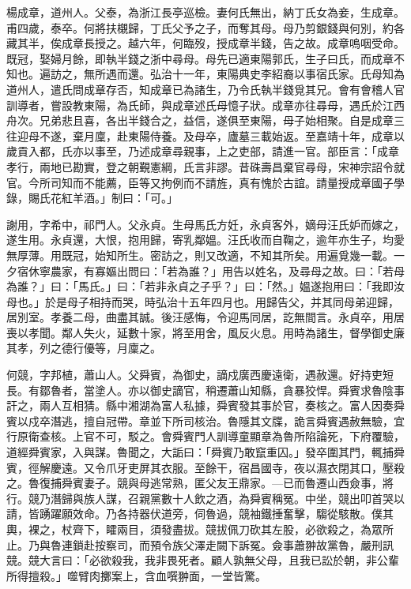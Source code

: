 \begin{pinyinscope}
楊成章，道州人。父泰，為浙江長亭巡檢。妻何氏無出，納丁氏女為妾，生成章。甫四歲，泰卒。何將扶櫬歸，丁氏父予之子，而奪其母。母乃剪銀錢與何別，約各藏其半，俟成章長授之。越六年，何臨歿，授成章半錢，告之故。成章嗚咽受命。既冠，娶婦月餘，即執半錢之浙中尋母。母先已適東陽郭氏，生子曰氏，而成章不知也。遍訪之，無所遇而還。弘治十一年，東陽典史李紹裔以事宿氏家。氏母知為道州人，遣氏問成章存否，知成章已為諸生，乃令氏執半錢覓其兄。會有會稽人官訓導者，嘗設教東陽，為氏師，與成章述氏母憶子狀。成章亦往尋母，遇氏於江西舟次。兄弟悲且喜，各出半錢合之，益信，遂俱至東陽，母子始相聚。自是成章三往迎母不遂，棄月廩，赴東陽侍養。及母卒，廬墓三載始返。至嘉靖十年，成章以歲貢入都，氏亦以事至，乃述成章尋親事，上之吏部，請進一官。部臣言：「成章孝行，兩地已勘實，登之朝覲憲綱，氏言非謬。昔硃壽昌棄官尋母，宋神宗詔令就官。今所司知而不能薦，臣等又拘例而不請旌，真有愧於古誼。請量授成章國子學錄，賜氏花紅羊酒。」制曰：「可。」

謝用，字希中，祁門人。父永貞。生母馬氏方妊，永貞客外，嫡母汪氏妒而嫁之，遂生用。永貞還，大恨，抱用歸，寄乳鄰媼。汪氏收而自鞠之，逾年亦生子，均愛無厚薄。用既冠，始知所生。密訪之，則又改適，不知其所矣。用遍覓幾一載。一夕宿休寧農家，有寡嫗出問曰：「若為誰？」用告以姓名，及尋母之故。曰：「若母為誰？」曰：「馬氏。」曰：「若非永貞之子乎？」曰：「然。」媼遂抱用曰：「我即汝母也。」於是母子相持而哭，時弘治十五年四月也。用歸告父，并其同母弟迎歸，居別室。孝養二母，曲盡其誠。後汪感悔，令迎馬同居，訖無間言。永貞卒，用居喪以孝聞。鄰人失火，延數十家，將至用舍，風反火息。用時為諸生，督學御史廉其孝，列之德行優等，月廩之。

何競，字邦植，蕭山人。父舜賓，為御史，謫戍廣西慶遠衛，遇赦還。好持吏短長。有鄒魯者，當塗人。亦以御史謫官，稍遷蕭山知縣，貪暴狡悍。舜賓求魯陰事訐之，兩人互相猜。縣中湘湖為富人私據，舜賓發其事於官，奏核之。富人因奏舜賓以戍卒潛逃，擅自冠帶。章並下所司核治。魯隱其文牒，詭言舜賓遇赦無驗，宜行原衛查核。上官不可，駁之。會舜賓門人訓導童顯章為魯所陷論死，下府覆驗，道經舜賓家，入與謀。魯聞之，大詬曰：「舜賓乃敢竄重囚。」發卒圍其門，輒捕舜賓，徑解慶遠。又令爪牙吏屏其衣服。至餘干，宿昌國寺，夜以濕衣閉其口，壓殺之。魯復捕舜賓妻子。競與母逃常熟，匿父友王鼎家。—已而魯遷山西僉事，將行。競乃潛歸與族人謀，召親黨數十人飲之酒，為舜賓稱冤。中坐，競出叩首哭以請，皆踴躍願效命。乃各持器伏道旁，伺魯過，競袖鐵捶奮擊，騶從駭散。僕其輿，裸之，杖齊下，矐兩目，須發盡拔。競拔佩刀砍其左股，必欲殺之，為眾所止。乃與魯連鎖赴按察司，而預令族父澤走闕下訴冤。僉事蕭翀故黨魯，嚴刑訊競。競大言曰：「必欲殺我，我非畏死者。顧人孰無父母，且我已訟於朝，非公輩所得擅殺。」噬臂肉擲案上，含血噀翀面，一堂皆驚。


\end{pinyinscope}
